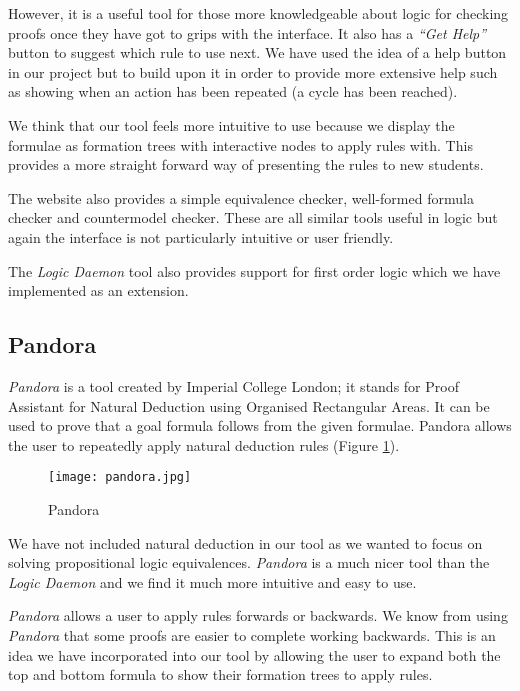 \documentclass{report}
\begin{document}
However, it is a useful tool for those more knowledgeable about logic for checking proofs once they have got to grips with the interface. It also has a \textit{``Get Help''} button to suggest which rule to use next. We have used the idea of a help button in our project but to build upon it in order to provide more extensive help such as showing when an action has been repeated (a cycle has been reached).

We think that our tool feels more intuitive to use because we display the formulae as formation trees with interactive nodes to apply rules with. This provides a more straight forward way of presenting the rules to new students.

The website also provides a simple equivalence checker, well-formed formula checker and countermodel checker. These are all similar tools useful in logic but again the interface is not particularly intuitive or user friendly.

The \emph{Logic Daemon} tool also provides support for first order logic which we have implemented as an extension.

\subsection{Pandora}
\label{sub:pandora}

\emph{Pandora}\cite{pandora} is a tool created by Imperial College London; it stands for Proof Assistant for Natural Deduction using Organised Rectangular Areas. It can be used to prove that a goal formula follows from the given formulae. Pandora allows the user to repeatedly apply natural deduction rules (Figure \ref{pandora}).

\begin{figure}[ht!]
    \centering
    \texttt{[image: pandora.jpg]}
    \caption{Pandora}
    \label{pandora}
\end{figure}

We have not included natural deduction in our tool as we wanted to focus on solving propositional logic equivalences. \emph{Pandora} is a much nicer tool than the \emph{Logic Daemon} and we find it much more intuitive and easy to use.

\emph{Pandora} allows a user to apply rules forwards or backwards. We know from using \emph{Pandora} that some proofs are easier to complete working backwards. This is an idea we have incorporated into our tool by allowing the user to expand both the top and bottom formula to show their formation trees to apply rules. 
\end{document}
